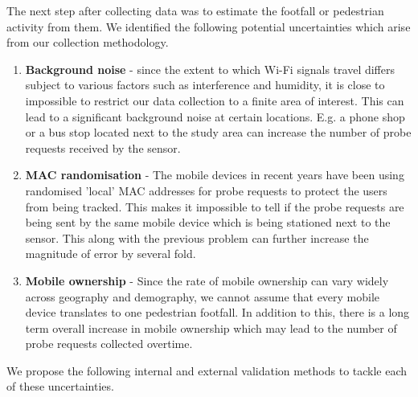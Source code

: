 The next step after collecting data was to estimate the footfall or pedestrian activity from them. We identified the following potential uncertainties which arise from our collection methodology.
\begin{enumerate}
	\item \textbf{Background noise} - since the extent to which Wi-Fi signals travel differs subject to various factors such as interference and humidity, it is close to impossible to restrict our data collection to a finite area of interest. This can lead to a significant background noise at certain locations. E.g. a phone shop or a bus stop located next to the study area can increase the number of probe requests received by the sensor.
	\item \textbf{MAC randomisation} - The mobile devices in recent years have been using randomised 'local' MAC addresses for probe requests to protect the users from being tracked. This makes it impossible to tell if the probe requests are being sent by the same mobile device which is being stationed next to the sensor. This along with the previous problem can further increase the magnitude of error by several fold.
	\item \textbf{Mobile ownership} - Since the rate of mobile ownership can vary widely across geography and demography, we cannot assume that every mobile device translates to one pedestrian footfall. In addition to this, there is a long term overall increase in mobile ownership which may lead to the number of probe requests collected overtime. 
\end{enumerate}
We propose the following internal and external validation methods to tackle each of these uncertainties.

